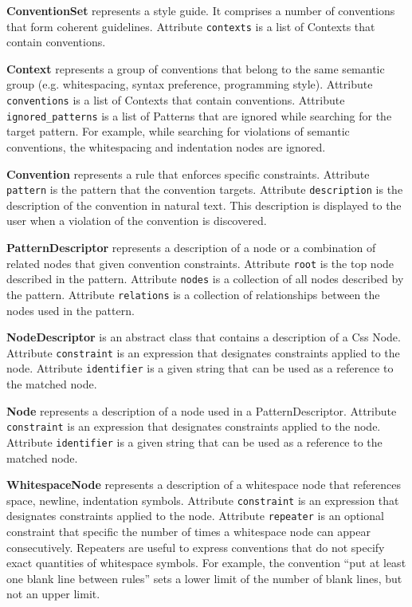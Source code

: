 \begin{description}

\item\textbf{ConventionSet} represents a style guide. It comprises a number of conventions that form coherent guidelines. Attribute \texttt{contexts} is a list of Contexts that contain conventions.


\item\textbf{Context} represents a group of conventions that belong to the same semantic group (e.g. whitespacing, syntax preference, programming style). Attribute \texttt{conventions} is a list of Contexts that contain conventions. Attribute \texttt{ignored\_patterns} is a list of Patterns that are ignored while searching for the target pattern. For example, while searching for violations of semantic conventions, the whitespacing and indentation nodes are ignored.

\item\textbf{Convention} represents a rule that enforces specific constraints. Attribute \texttt{pattern} is the pattern that the convention targets. Attribute \texttt{description} is the description of the convention in natural text. This description is displayed to the user when a violation of the convention is discovered.

\item\textbf{PatternDescriptor} represents a description of a node or a combination of related nodes that given convention constraints. Attribute \texttt{root} is the top node described in the pattern. Attribute \texttt{nodes} is a collection of all nodes described by the pattern. Attribute \texttt{relations} is a collection of relationships between the nodes used in the pattern.

\item\textbf{NodeDescriptor} is an abstract class that contains a description of a Css Node. Attribute
\texttt{constraint} is an expression that designates constraints applied to the node.
Attribute \texttt{identifier} is a given string that can be used as a reference to the matched node.

\item\textbf{Node} represents a description of a node used in a PatternDescriptor. Attribute
\texttt{constraint} is an expression that designates constraints applied to the node.
Attribute \texttt{identifier} is a given string that can be used as a reference to the matched node.

\item\textbf{WhitespaceNode} represents a description of a whitespace node that references space,
newline, indentation symbols. Attribute \texttt{constraint} is an expression that designates
constraints applied to the node. Attribute \texttt{repeater} is an optional constraint that specific
the number of times a whitespace node can appear consecutively. Repeaters are useful to express
conventions that do not specify exact quantities of whitespace symbols. For example, the convention
``put at least one blank line between rules'' sets a lower limit of the number of blank lines, but
not an upper limit.


\end{description}
